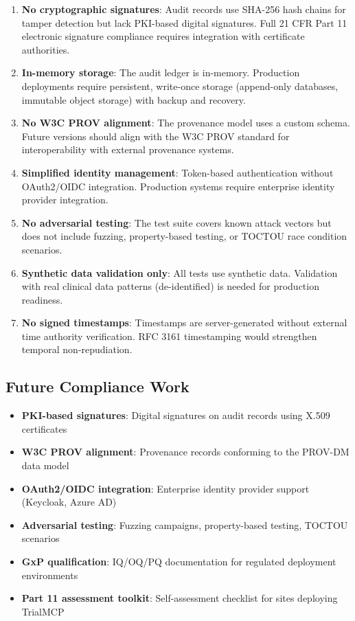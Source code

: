 \documentclass[10pt,letterpaper]{article}
\begin{document}
\begin{enumerate}[leftmargin=2em]
    \item \textbf{No cryptographic signatures}: Audit records use SHA-256 hash chains for tamper detection but lack PKI-based digital signatures. Full 21 CFR Part 11 electronic signature compliance requires integration with certificate authorities.

    \item \textbf{In-memory storage}: The audit ledger is in-memory. Production deployments require persistent, write-once storage (append-only databases, immutable object storage) with backup and recovery.

    \item \textbf{No W3C PROV alignment}: The provenance model uses a custom schema. Future versions should align with the W3C PROV standard for interoperability with external provenance systems.

    \item \textbf{Simplified identity management}: Token-based authentication without OAuth2/OIDC integration. Production systems require enterprise identity provider integration.

    \item \textbf{No adversarial testing}: The test suite covers known attack vectors but does not include fuzzing, property-based testing, or TOCTOU race condition scenarios.

    \item \textbf{Synthetic data validation only}: All tests use synthetic data. Validation with real clinical data patterns (de-identified) is needed for production readiness.

    \item \textbf{No signed timestamps}: Timestamps are server-generated without external time authority verification. RFC 3161 timestamping would strengthen temporal non-repudiation.
\end{enumerate}

\subsection{Future Compliance Work}

\begin{itemize}[leftmargin=2em]
    \item \textbf{PKI-based signatures}: Digital signatures on audit records using X.509 certificates
    \item \textbf{W3C PROV alignment}: Provenance records conforming to the PROV-DM data model
    \item \textbf{OAuth2/OIDC integration}: Enterprise identity provider support (Keycloak, Azure AD)
    \item \textbf{Adversarial testing}: Fuzzing campaigns, property-based testing, TOCTOU scenarios
    \item \textbf{GxP qualification}: IQ/OQ/PQ documentation for regulated deployment environments
    \item \textbf{Part 11 assessment toolkit}: Self-assessment checklist for sites deploying TrialMCP
\end{itemize}
\end{document}
